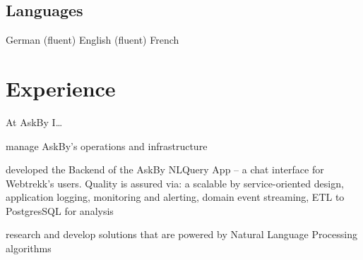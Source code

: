\documentclass[]{deedy-resume-openfont}
\begin{document}
\begin{minipage}[t]{0.33\textwidth}
\sectionsep
\subsection{Languages}
German (fluent) \textbullet{}
English (fluent) \textbullet{}
French



%
%

\end{minipage} 
\hfill
\begin{minipage}[t]{0.62\textwidth} 


\section{Experience}

\vspace{10pt} %

At AskBy I\ldots
\vspace{9pt} %
\begin{tightemize}
\item manage AskBy's operations and infrastructure
\item developed the Backend of the AskBy NLQuery App -- a chat interface for Webtrekk's users.
    Quality is assured via: a scalable by service-oriented design, application logging, monitoring and alerting, domain event streaming, ETL to PostgresSQL for analysis
\item research and develop solutions that are powered by Natural Language Processing algorithms
\end{tightemize}
\sectionsep


\end{minipage}
\end{document}
